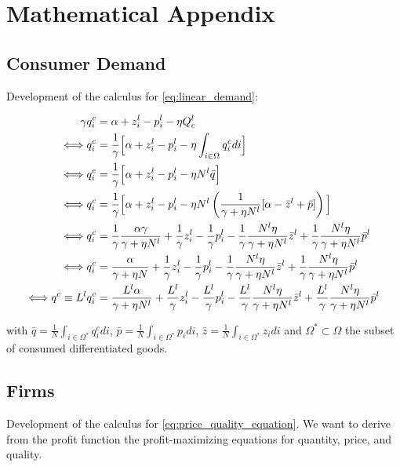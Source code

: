\appendix
\section{Mathematical Appendix} \label{mathematical_appendix}

\subsection{Consumer Demand} \label{app:consumer_demand}
Development of the calculus for \eqref{eq:linear_demand}:


\begin{align*}
    \gamma q_i^c &= \alpha + z_i^l - p_i^l - \eta Q_c^l  \\
    \Longleftrightarrow q_i^c &= \frac{1}\gamma\Bigr[\alpha + z_i^l -  p_i^l - \eta \int_{i \in \Omega } q_i^c di\Bigl] \\
    \Longleftrightarrow  q_i^c &= \frac{1}\gamma \Big[\alpha + z_i^l - p_i^l - \eta N^l \bar{q} \Bigr] \\
    \Longleftrightarrow  q_i^c &= \frac{1}\gamma\Bigr[\alpha + z_i^l - p_i^l - \eta N^l \left(\frac{1}{\gamma + \eta N^l}\large[ \alpha - \bar{z}^l + \bar{p} \large]\right) \Big] \\
    \Longleftrightarrow q_i^c &= \frac{1}{\gamma}\frac{\alpha \gamma}{\gamma + \eta N^l} +\frac{1}{\gamma} z_i^l - \frac{1}{\gamma} p_i^l - \frac{1}{\gamma} \frac{N^l \eta}{\gamma + \eta N^l}\bar{z}^l + \frac{1}{\gamma} \frac{N^l \eta}{\gamma + \eta N^l} \bar{p}^l \\
     \Longleftrightarrow q_i^c &= \frac{\alpha}{\gamma + \eta N} +\frac{1}{\gamma} z_i^l - \frac{1}{\gamma} p_i^l - \frac{1}{\gamma} \frac{N^l \eta}{\gamma + \eta N^l}\bar{z}^l + \frac{1}{\gamma}\frac{N^l \eta}{\gamma + \eta N^l} \bar{p}^l \\
     \Longleftrightarrow q^c \equiv L^l q_i^c &= \frac{L^l \alpha}{\gamma + \eta N^l} +\frac{L^l}{\gamma} z_i^l - \frac{L^l}{\gamma} p_i^l - \frac{L^l}{\gamma} \frac{N^l \eta}{\gamma + \eta N^l}\bar{z}^l + \frac{L^l}{\gamma} \frac{N^l \eta}{\gamma + \eta N^l} \bar{p}^l 
\end{align*}

with $\bar{q} = \frac{1}{N} \int_{i \in \Omega^*} q_i^c di$, $\bar{p} = \frac{1}{N} \int_{i \in \Omega^*} p_i di$, $\bar{z} = \frac{1}{N} \int_{i \in \Omega^*} z_i di$ and $\Omega^* \subset \Omega$ the subset of consumed differentiated goods.

\subsection{Firms} \label{app:firms}
Development of the calculus for \eqref{eq:price_quality_equation}. We want to derive from the profit function the profit-maximizing equations for quantity, price, and quality.

